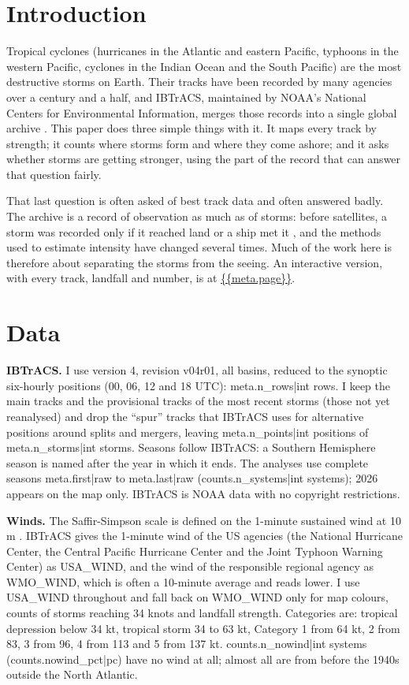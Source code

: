 \documentclass[11pt,a4paper]{article}
\begin{document}
\section{Introduction}
Tropical cyclones (hurricanes in the Atlantic and eastern Pacific, typhoons in the western Pacific, cyclones in the Indian Ocean and the South Pacific) are the most destructive storms on Earth. Their tracks have been recorded by many agencies over a century and a half, and IBTrACS, maintained by NOAA's National Centers for Environmental Information, merges those records into a single global archive \citep{knapp2010,gahtan2024}. This paper does three simple things with it. It maps every track by strength; it counts where storms form and where they come ashore; and it asks whether storms are getting stronger, using the part of the record that can answer that question fairly.

That last question is often asked of best track data and often answered badly. The archive is a record of observation as much as of storms: before satellites, a storm was recorded only if it reached land or a ship met it \citep{wikitc}, and the methods used to estimate intensity have changed several times. Much of the work here is therefore about separating the storms from the seeing. An interactive version, with every track, landfall and number, is at \url{{{meta.page}}}.

\section{Data}
\textbf{IBTrACS.} I use version 4, revision v04r01, all basins, reduced to the synoptic six-hourly positions (00, 06, 12 and 18 UTC): {{meta.n_rows|int}} rows. I keep the main tracks and the provisional tracks of the most recent storms (those not yet reanalysed) and drop the ``spur'' tracks that IBTrACS uses for alternative positions around splits and mergers, leaving {{meta.n_points|int}} positions of {{meta.n_storms|int}} storms. Seasons follow IBTrACS: a Southern Hemisphere season is named after the year in which it ends. The analyses use complete seasons {{meta.first|raw}} to {{meta.last|raw}} ({{counts.n_systems|int}} systems); 2026 appears on the map only. IBTrACS is NOAA data with no copyright restrictions.

\textbf{Winds.} The Saffir-Simpson scale is defined on the 1-minute sustained wind at 10 m \citep{wikiss}. IBTrACS gives the 1-minute wind of the US agencies (the National Hurricane Center, the Central Pacific Hurricane Center and the Joint Typhoon Warning Center) as USA\_WIND, and the wind of the responsible regional agency as WMO\_WIND, which is often a 10-minute average and reads lower. I use USA\_WIND throughout and fall back on WMO\_WIND only for map colours, counts of storms reaching 34 knots and landfall strength. Categories are: tropical depression below 34 kt, tropical storm 34 to 63 kt, Category 1 from 64 kt, 2 from 83, 3 from 96, 4 from 113 and 5 from 137 kt. {{counts.n_nowind|int}} systems ({{counts.nowind_pct|pc}}) have no wind at all; almost all are from before the 1940s outside the North Atlantic.
\end{document}
